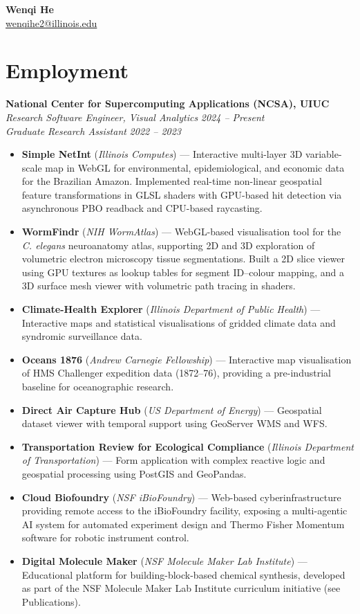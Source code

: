 \documentclass[11pt,letterpaper]{article}
\newcommand{\heading}[2]{%
  \textbf{#1} \hfill #2\\[2pt]
}
\newcommand{\subheading}[2]{%
  \textit{#1} \hfill \textit{#2}\\
}
\begin{document}
\begin{center}
  {\LARGE \textbf{Wenqi He}}\\[4pt]
  \href{mailto:wenqihe2@illinois.edu}{wenqihe2@illinois.edu}
\end{center}

\section*{Employment}

\heading{National Center for Supercomputing Applications (NCSA), UIUC}{}
\subheading{Research Software Engineer, Visual Analytics}{2024 -- Present}
\subheading{Graduate Research Assistant}{2022 -- 2023}

\begin{itemize}[leftmargin=*, itemsep=3pt, topsep=0pt, partopsep=0pt]
  \item \textbf{Simple NetInt} (\textit{Illinois Computes}) --- Interactive multi-layer 3D variable-scale map in WebGL for environmental, epidemiological, and economic data for the Brazilian Amazon. Implemented real-time non-linear geospatial feature transformations in GLSL shaders with GPU-based hit detection via asynchronous PBO readback and CPU-based raycasting.
  \item \textbf{WormFindr} (\textit{NIH WormAtlas}) --- WebGL-based visualisation tool for the \textit{C. elegans} neuroanatomy atlas, supporting 2D and 3D exploration of volumetric electron microscopy tissue segmentations. Built a 2D slice viewer using GPU textures as lookup tables for segment ID--colour mapping, and a 3D surface mesh viewer with volumetric path tracing in shaders.
  \item \textbf{Climate-Health Explorer} (\textit{Illinois Department of Public Health}) --- Interactive maps and statistical visualisations of gridded climate data and syndromic surveillance data.
  \item \textbf{Oceans 1876} (\textit{Andrew Carnegie Fellowship}) --- Interactive map visualisation of HMS Challenger expedition data (1872--76), providing a pre-industrial baseline for oceanographic research.
  \item \textbf{Direct Air Capture Hub} (\textit{US Department of Energy}) --- Geospatial dataset viewer with temporal support using GeoServer WMS and WFS.
  \item \textbf{Transportation Review for Ecological Compliance} (\textit{Illinois Department of Transportation}) --- Form application with complex reactive logic and geospatial processing using PostGIS and GeoPandas.
  \item \textbf{Cloud Biofoundry} (\textit{NSF iBioFoundry}) --- Web-based cyberinfrastructure providing remote access to the iBioFoundry facility, exposing a multi-agentic AI system for automated experiment design and Thermo Fisher Momentum software for robotic instrument control.
  \item \textbf{Digital Molecule Maker} (\textit{NSF Molecule Maker Lab Institute}) --- Educational platform for building-block-based chemical synthesis, developed as part of the NSF Molecule Maker Lab Institute curriculum initiative (see Publications).
\end{itemize}
\end{document}
